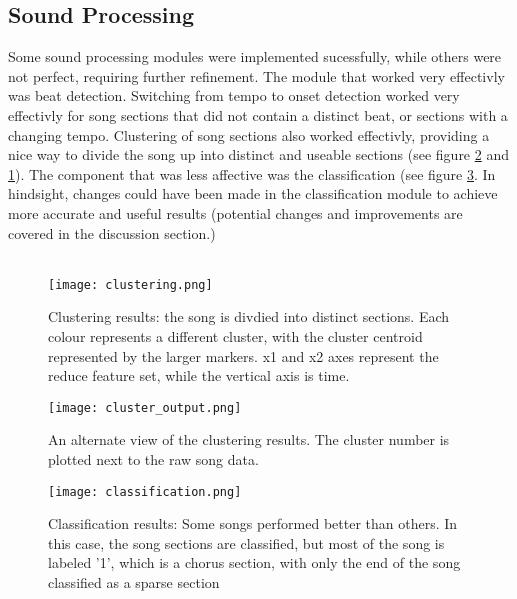 \subsection{Sound Processing}



Some sound processing modules were implemented sucessfully, while others were not perfect, requiring further refinement. The module that worked very effectivly was beat detection. Switching from tempo to onset detection worked very effectivly for song sections that did not contain a distinct beat, or sections with a changing tempo. Clustering of song sections also worked effectivly, providing a nice way to divide the song up into distinct and useable sections (see figure \ref{fig:cluster_output} and \ref{fig:clustering}). The component that was less affective was the classification (see figure \ref{fig:classification}. In hindsight, changes could have been made in the classification module to achieve more accurate and useful results (potential changes and improvements are covered in the discussion section.) \\
\\
\begin{figure}[H]
      \centering
      \texttt{[image: clustering.png]}
      \caption{Clustering results: the song is divdied into distinct sections. Each colour represents a different cluster, with the cluster centroid represented by the larger markers. x1 and x2 axes represent the reduce feature set, while the vertical axis is time.}
      \label{fig:clustering}
\end{figure}
\begin{figure}[H]
      \centering
      \texttt{[image: cluster\_output.png]}
      \caption{An alternate view of the clustering results. The cluster number is plotted next to the raw song data.}
      \label{fig:cluster_output}
\end{figure}
\begin{figure}[H]
      \centering
      \texttt{[image: classification.png]}
      \caption{Classification results: Some songs performed better than others. In this case, the song sections are classified, but most of the song is labeled '1', which is a chorus section, with only the end of the song classified as a sparse section}
      \label{fig:classification}
\end{figure}

